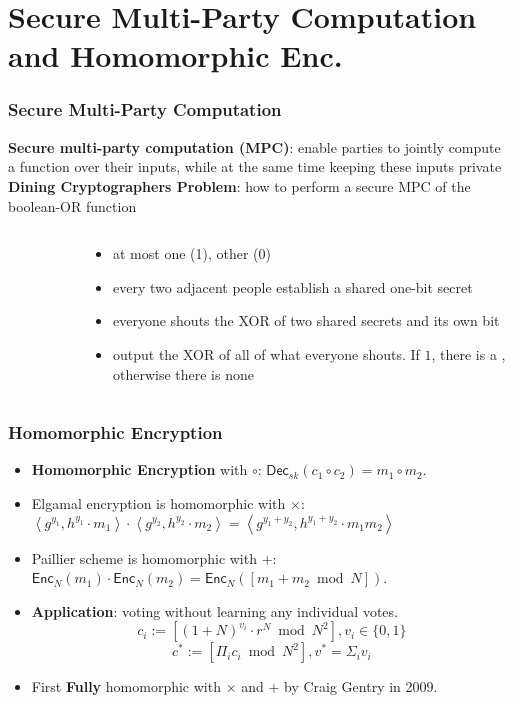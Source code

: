 \section{Secure Multi-Party Computation and Homomorphic Enc.}
\begin{frame}\frametitle{Secure Multi-Party Computation}
\textbf{Secure multi-party computation (MPC)}: enable parties to jointly compute a function over their inputs, while at the same time keeping these inputs private\\
\textbf{Dining Cryptographers Problem}: how to perform a secure MPC of the boolean-OR function
\begin{columns}
\begin{column}{4cm}
\begin{figure}
\begin{center}

\end{center}
\end{figure}
\end{column}
\begin{column}{6cm}
\begin{itemize}
\item at most one {\color{red} \LARGE \Gentsroom} (1), other {\color{blue} \LARGE \Gentsroom} (0)
\item every two adjacent people establish a shared one-bit secret
\item everyone shouts the XOR of two shared secrets and its own bit
\item output the XOR of all of what everyone shouts. If $1$, there is a {\color{red} \LARGE \Gentsroom}, otherwise there is none
\end{itemize}
\end{column}
\end{columns}
\end{frame}
\begin{frame}\frametitle{Homomorphic Encryption}
\begin{itemize}
\item \textbf{Homomorphic Encryption} with $\circ$: $\mathsf{Dec}_{sk}(c_1\circ c_2)=m_1\circ m_2$.
\item Elgamal encryption is homomorphic with $\times$: $\left<g^{y_1},h^{y_1}\cdot m_1\right>\cdot \left<g^{y_2},h^{y_2}\cdot m_2\right> = \left<g^{y_1+y_2},h^{y_1+y_2}\cdot m_1m_2\right>$
\item Paillier scheme is homomorphic with $+$: $\mathsf{Enc}_N(m_1) \cdot \mathsf{Enc}_N(m_2) = \mathsf{Enc}_N([m_1+m_2 \bmod N])$.
\item \textbf{Application}: voting without learning any individual votes.
\[c_i := [(1+N)^{v_i}\cdot r^N \bmod N^2], v_i \in \{0,1\}\]
\[c^* := [\Pi_{i} c_i \bmod N^2], v^* = \Sigma_{i} v_i \]
\item First \textbf{Fully} homomorphic with $\times$ and $+$ by Craig Gentry in 2009.
\end{itemize}
\end{frame}
